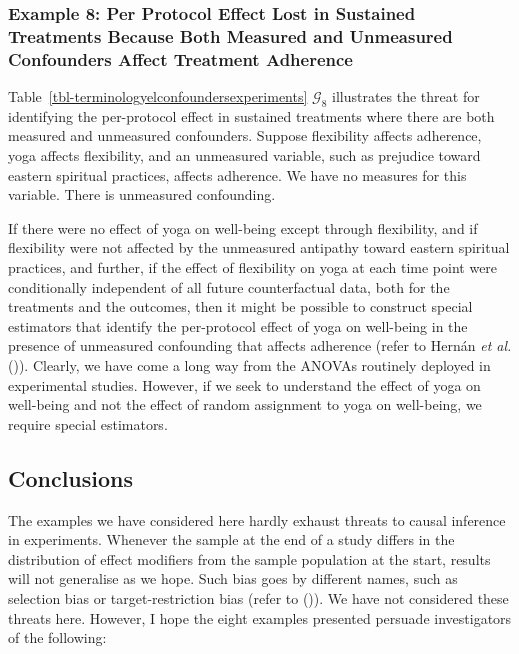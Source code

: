 \documentclass[
  single column]{article}
\begin{document}
\subsubsection{Example 8: Per Protocol Effect Lost in Sustained
Treatments Because Both Measured and Unmeasured Confounders Affect
Treatment
Adherence}\label{example-8-per-protocol-effect-lost-in-sustained-treatments-because-both-measured-and-unmeasured-confounders-affect-treatment-adherence}

Table~\ref{tbl-terminologyelconfoundersexperiments} \(\mathcal{G}_{8}\)
illustrates the threat for identifying the per-protocol effect in
sustained treatments where there are both measured and unmeasured
confounders. Suppose flexibility affects adherence, yoga affects
flexibility, and an unmeasured variable, such as prejudice toward
eastern spiritual practices, affects adherence. We have no measures for
this variable. There is unmeasured confounding.

If there were no effect of yoga on well-being except through
flexibility, and if flexibility were not affected by the unmeasured
antipathy toward eastern spiritual practices, and further, if the effect
of flexibility on yoga at each time point were conditionally independent
of all future counterfactual data, both for the treatments and the
outcomes, then it might be possible to construct special estimators that
identify the per-protocol effect of yoga on well-being in the presence
of unmeasured confounding that affects adherence (refer to Hernán
\emph{et al.} ()). Clearly, we have
come a long way from the ANOVAs routinely deployed in experimental
studies. However, if we seek to understand the effect of yoga on
well-being and not the effect of random assignment to yoga on
well-being, we require special estimators.

\subsection{Conclusions}\label{conclusions}

The examples we have considered here hardly exhaust threats to causal
inference in experiments. Whenever the sample at the end of a study
differs in the distribution of effect modifiers from the sample
population at the start, results will not generalise as we hope. Such
bias goes by different names, such as selection bias or
target-restriction bias (refer to
()). We have not considered these
threats here. However, I hope the eight examples presented persuade
investigators of the following:
\end{document}
